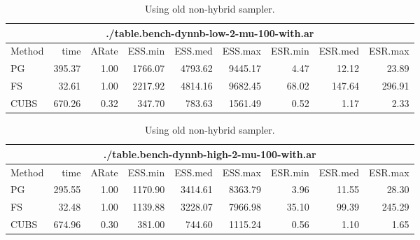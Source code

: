 \documentclass[11pt]{article}
\begin{document}
\begin{table}
\begin{tabular}{l r r r r r r r r } 
\hline
\multicolumn{9}{c}{./table.bench-dynnb-low-2-mu-100-with.ar} \\
\hline
          Method  &     time &    ARate &  ESS.min &  ESS.med &  ESS.max &  ESR.min &  ESR.med &  ESR.max \\ 
              PG  &   395.37 &     1.00 &  1766.07 &  4793.62 &  9445.17 &     4.47 &    12.12 &    23.89 \\ 
              FS  &    32.61 &     1.00 &  2217.92 &  4814.16 &  9682.45 &    68.02 &   147.64 &   296.91 \\ 
            CUBS  &   670.26 &     0.32 &   347.70 &   783.63 &  1561.49 &     0.52 &     1.17 &     2.33
 \end{tabular}

\begin{tabular}{l r r r r r r r r } 
\hline
\multicolumn{9}{c}{./table.bench-dynnb-high-2-mu-100-with.ar} \\
\hline
          Method  &     time &    ARate &  ESS.min &  ESS.med &  ESS.max &  ESR.min &  ESR.med &  ESR.max \\ 
              PG  &   295.55 &     1.00 &  1170.90 &  3414.61 &  8363.79 &     3.96 &    11.55 &    28.30 \\ 
              FS  &    32.48 &     1.00 &  1139.88 &  3228.07 &  7966.98 &    35.10 &    99.39 &   245.29 \\ 
            CUBS  &   674.96 &     0.30 &   381.00 &   744.60 &  1115.24 &     0.56 &     1.10 &     1.65
 \end{tabular}

\caption{Using old non-hybrid sampler.}

\end{table}

\newpage
\end{document}
